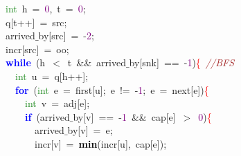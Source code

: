 {{\mbox{}\ \ \textcolor{ForestGreen}{int}\ h\ \textcolor{BrickRed}{=}\ \textcolor{Purple}{0}\textcolor{BrickRed}{,}\ t\ \textcolor{BrickRed}{=}\ \textcolor{Purple}{0}\textcolor{BrickRed}{;} \\
\mbox{}\ \ q\textcolor{BrickRed}{[}t\textcolor{BrickRed}{++]}\ \textcolor{BrickRed}{=}\ src\textcolor{BrickRed}{;} \\
\mbox{}\ \ arrived$\_$by\textcolor{BrickRed}{[}src\textcolor{BrickRed}{]}\ \textcolor{BrickRed}{=}\ \textcolor{BrickRed}{-}\textcolor{Purple}{2}\textcolor{BrickRed}{;} \\
\mbox{}\ \ incr\textcolor{BrickRed}{[}src\textcolor{BrickRed}{]}\ \textcolor{BrickRed}{=}\ oo\textcolor{BrickRed}{;} \\
\mbox{}\ \ \textbf{\textcolor{Blue}{while}}\ \textcolor{BrickRed}{(}h\ \textcolor{BrickRed}{$<$}\ t\ \textcolor{BrickRed}{\&\&}\ arrived$\_$by\textcolor{BrickRed}{[}snk\textcolor{BrickRed}{]}\ \textcolor{BrickRed}{==}\ \textcolor{BrickRed}{-}\textcolor{Purple}{1}\textcolor{BrickRed}{)}\textcolor{Red}{\{}\ \textit{\textcolor{Brown}{//BFS}} \\
\mbox{}\ \ \ \ \textcolor{ForestGreen}{int}\ u\ \textcolor{BrickRed}{=}\ q\textcolor{BrickRed}{[}h\textcolor{BrickRed}{++];} \\
\mbox{}\ \ \ \ \textbf{\textcolor{Blue}{for}}\ \textcolor{BrickRed}{(}\textcolor{ForestGreen}{int}\ e\ \textcolor{BrickRed}{=}\ first\textcolor{BrickRed}{[}u\textcolor{BrickRed}{];}\ e\ \textcolor{BrickRed}{!=}\ \textcolor{BrickRed}{-}\textcolor{Purple}{1}\textcolor{BrickRed}{;}\ e\ \textcolor{BrickRed}{=}\ next\textcolor{BrickRed}{[}e\textcolor{BrickRed}{])}\textcolor{Red}{\{} \\
\mbox{}\ \ \ \ \ \ \textcolor{ForestGreen}{int}\ v\ \textcolor{BrickRed}{=}\ adj\textcolor{BrickRed}{[}e\textcolor{BrickRed}{];} \\
\mbox{}\ \ \ \ \ \ \textbf{\textcolor{Blue}{if}}\ \textcolor{BrickRed}{(}arrived$\_$by\textcolor{BrickRed}{[}v\textcolor{BrickRed}{]}\ \textcolor{BrickRed}{==}\ \textcolor{BrickRed}{-}\textcolor{Purple}{1}\ \textcolor{BrickRed}{\&\&}\ cap\textcolor{BrickRed}{[}e\textcolor{BrickRed}{]}\ \textcolor{BrickRed}{$>$}\ \textcolor{Purple}{0}\textcolor{BrickRed}{)}\textcolor{Red}{\{} \\
\mbox{}\ \ \ \ \ \ \ \ arrived$\_$by\textcolor{BrickRed}{[}v\textcolor{BrickRed}{]}\ \textcolor{BrickRed}{=}\ e\textcolor{BrickRed}{;} \\
\mbox{}\ \ \ \ \ \ \ \ incr\textcolor{BrickRed}{[}v\textcolor{BrickRed}{]}\ \textcolor{BrickRed}{=}\ \textbf{\textcolor{Black}{min}}\textcolor{BrickRed}{(}incr\textcolor{BrickRed}{[}u\textcolor{BrickRed}{],}\ cap\textcolor{BrickRed}{[}e\textcolor{BrickRed}{]);} \\
}}

